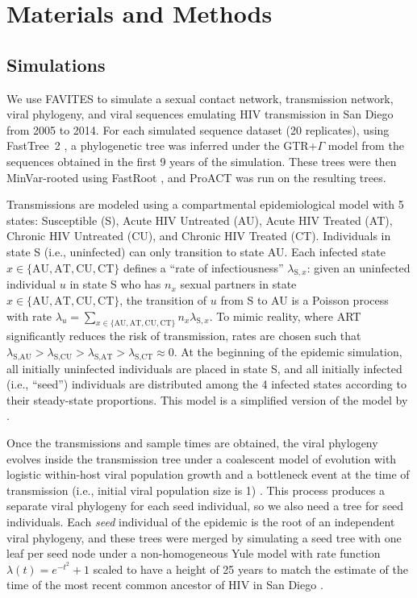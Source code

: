 \documentclass[oupdraft]{sysbio}
\begin{document}
\section{Materials and Methods}
\subsection{Simulations}
We use FAVITES to simulate a sexual contact network, transmission network, viral phylogeny, and viral sequences emulating HIV transmission in San Diego from 2005 to 2014. 
For each simulated sequence dataset (20 replicates),
using FastTree~2 \citep{Price2010},
a phylogenetic tree was inferred under the GTR+$\Gamma$  model from the sequences obtained in the first 9 years of the simulation.
These trees were then MinVar-rooted using FastRoot \citep{Mai2017},
and ProACT was run on the resulting trees.

Transmissions are modeled using a compartmental epidemiological model with 5 states: Susceptible (S), Acute HIV Untreated (AU), Acute HIV Treated (AT), Chronic HIV Untreated (CU), and Chronic HIV Treated (CT). Individuals in state S (i.e., uninfected) can only transition to state AU. Each infected state $x\in\{\text{AU},\text{AT},\text{CU},\text{CT}\}$ defines a ``rate of infectiousness'' $\lambda_{\text{S},x}$: given an uninfected individual $u$ in state S who has $n_x$ sexual partners in state $x\in\{\text{AU},\text{AT},\text{CU},\text{CT}\}$, the transition of $u$ from S to AU is a Poisson process with rate $\lambda_u=\sum_{x\in\{\text{AU},\text{AT},\text{CU},\text{CT}\}}{n_{x}\lambda_{\text{S},x}}$. To mimic reality, where ART significantly reduces the risk of transmission, rates are chosen such that $\lambda_{\text{S},\text{AU}} > \lambda_{\text{S},\text{CU}} > \lambda_{\text{S},\text{AT}} > \lambda_{\text{S},\text{CT}} \approx 0$. At the beginning of the epidemic simulation, all initially uninfected individuals are placed in state S, and all initially infected (i.e., ``seed'') individuals are distributed among the 4 infected states according to their steady-state proportions.
This model is a simplified version of the model  by \citet{Granich2009}.

Once the transmissions and sample times are obtained, the viral phylogeny evolves inside the transmission tree under a coalescent model of evolution with logistic within-host viral population growth and a bottleneck event at the time of transmission (i.e., initial viral population size is 1) \citep{Ratmann2017}.
This process produces a separate viral phylogeny for each seed individual, so we also need a tree for seed individuals. Each \textit{seed} individual of the epidemic is the root of an independent viral phylogeny, and these trees were merged by simulating a seed tree with one leaf per seed node under a non-homogeneous Yule model \citep{LeGat2016} with rate function $\lambda(t)=e^{-t^2}+1$ scaled to have a height of 25 years to match the estimate of the time of the most recent common ancestor of HIV in San Diego \citep[see][for details]{Moshiri2018}. 
\end{document}
